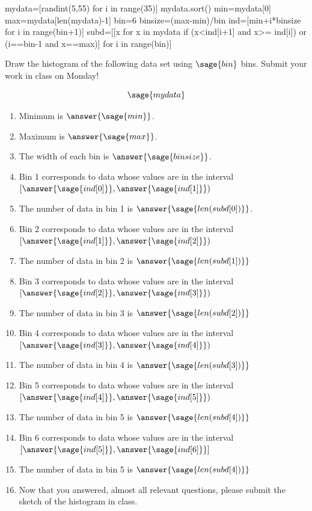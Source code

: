 \documentclass{ximera}
\begin{document}
\begin{problem}
\begin{sagesilent}
mydata=[randint(5,55) for i in range(35)]
mydata.sort()
min=mydata[0]
max=mydata[len(mydata)-1]
bin=6
binsize=(max-min)/bin
ind=[min+i*binsize for i in range(bin+1)]
subd=[[x for x in mydata if (x<ind[i+1] and x>= ind[i]) or (i==bin-1 and x==max)] for i in range(bin)]
\end{sagesilent}

Draw the histogram of the following data set using $\sage{bin}$ bins. Submit your work in class on Monday!

$$\sage{mydata}$$

\begin{enumerate}
    \item Minimum is $\answer{\sage{min}}$.
    \item Maximum is $\answer{\sage{max}}$.
    \item The width of each bin is $\answer{\sage{binsize}}$.
    \item Bin 1 corresponds to data whose values are in the interval 
    $[\answer{\sage{ind[0]}}, \answer{\sage{ind[1]}})$
    \item The number of data in bin 1 is $\answer{\sage{len(subd[0])}}$.
    \item Bin 2 corresponds to data whose values are in the interval 
    $[\answer{\sage{ind[1]}}, \answer{\sage{ind[2]}})$
    \item The number of data in bin 2 is $\answer{\sage{len(subd[1])}}$
    \item Bin 3 corresponds to data whose values are in the interval 
    $[\answer{\sage{ind[2]}}, \answer{\sage{ind[3]}})$
    \item The number of data in bin 3 is $\answer{\sage{len(subd[2])}}$
    \item Bin 4 corresponds to data whose values are in the interval 
    $[\answer{\sage{ind[3]}}, \answer{\sage{ind[4]}})$
    \item The number of data in bin 4 is $\answer{\sage{len(subd[3])}}$
    \item Bin 5 corresponds to data whose values are in the interval 
    $[\answer{\sage{ind[4]}}, \answer{\sage{ind[5]}})$
    \item The number of data in bin 5 is $\answer{\sage{len(subd[4])}}$
    \item Bin 6 corresponds to data whose values are in the interval 
    $[\answer{\sage{ind[5]}}, \answer{\sage{ind[6]}}]$
    \item The number of data in bin 5 is $\answer{\sage{len(subd[4])}}$
    \item Now that you answered, almost all relevant questions, please submit the sketch of the histogram in class.
\end{enumerate}
\end{problem}
\end{document}
